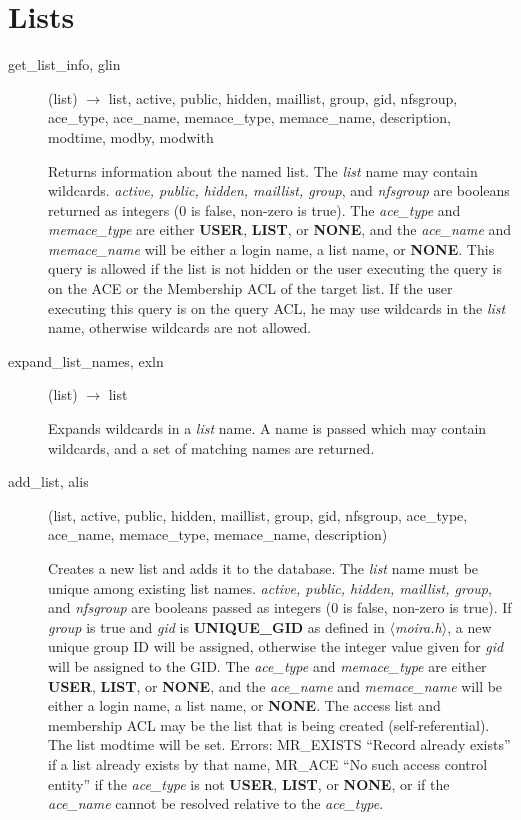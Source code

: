 \documentclass{article}
\begin{document}
\section{Lists}

\begin{description}

\item[get\_list\_info, glin](list) $\rightarrow$ list, active, public, hidden,
maillist, group, gid, nfsgroup, ace\_type, ace\_name, memace\_type,
memace\_name, description, modtime, modby,
modwith

Returns information about the named list.  The {\em list} name may
contain wildcards.  {\em active, public, hidden, maillist, group}, and
{\em nfsgroup} are booleans returned as integers (0 is false, non-zero
is true).  The {\em ace\_type} and {\em memace\_type} are either {\bf
USER}, {\bf LIST}, or {\bf NONE}, and the {\em ace\_name} and {\em
memace\_name} will be either a login name, a list name, or {\bf NONE}.
This query is allowed if the list is not hidden or the user executing
the query is on the ACE or the Membership ACL of the target list.  If
the user executing this query is on the query ACL, he may use wildcards
in the {\em list} name, otherwise wildcards are not allowed.

\item[expand\_list\_names, exln](list) $\rightarrow$ list

Expands wildcards in a {\em list} name.  A name is passed which may
contain wildcards, and a set of matching names are returned.

\item[add\_list, alis](list, active, public, hidden, maillist, group, gid,
nfsgroup, ace\_type, ace\_name, memace\_type, memace\_name, description)

Creates a new list and adds it to the database. The {\em list} name must
be unique among existing list names. {\em active, public, hidden,
maillist, group}, and {\em nfsgroup} are booleans passed as integers (0
is false, non-zero is true). If {\em group} is true and {\em gid} is
{\bf UNIQUE\_GID} as defined in {\em $\langle$moira.h$\rangle$}, a new
unique group ID will be assigned, otherwise the integer value given for
{\em gid} will be assigned to the GID. The {\em ace\_type} and {\em
memace\_type} are either {\bf USER}, {\bf LIST}, or {\bf NONE}, and the
{\em ace\_name} and {\em memace\_name} will be either a login name, a
list name, or {\bf NONE}.  The access list and membership ACL may be the
list that is being created (self-referential). The list modtime will be
set. Errors: MR\_EXISTS ``Record already exists'' if a list already
exists by that name, MR\_ACE ``No such access control entity'' if the
{\em ace\_type} is not {\bf USER}, {\bf LIST}, or {\bf NONE}, or if the
{\em ace\_name} cannot be resolved relative to the {\em ace\_type}.


\end{description}
\end{document}
